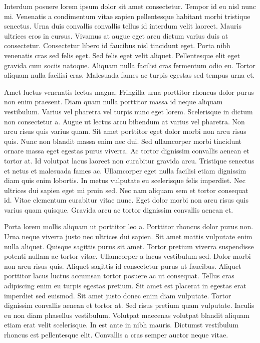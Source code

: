 \documentclass[uplatex, english, twocolumn]{jsarticle}
\begin{document}
Interdum posuere lorem ipsum dolor sit amet consectetur. Tempor id eu nisl nunc mi. Venenatis a condimentum vitae sapien pellentesque habitant morbi tristique senectus. Urna duis convallis convallis tellus id interdum velit laoreet. Mauris ultrices eros in cursus. Vivamus at augue eget arcu dictum varius duis at consectetur. Consectetur libero id faucibus nisl tincidunt eget. Porta nibh venenatis cras sed felis eget. Sed felis eget velit aliquet. Pellentesque elit eget gravida cum sociis natoque. Aliquam nulla facilisi cras fermentum odio eu. Tortor aliquam nulla facilisi cras. Malesuada fames ac turpis egestas sed tempus urna et.

Amet luctus venenatis lectus magna. Fringilla urna porttitor rhoncus dolor purus non enim praesent. Diam quam nulla porttitor massa id neque aliquam vestibulum. Varius vel pharetra vel turpis nunc eget lorem. Scelerisque in dictum non consectetur a. Augue ut lectus arcu bibendum at varius vel pharetra. Non arcu risus quis varius quam. Sit amet porttitor eget dolor morbi non arcu risus quis. Nunc non blandit massa enim nec dui. Sed ullamcorper morbi tincidunt ornare massa eget egestas purus viverra. Ac tortor dignissim convallis aenean et tortor at. Id volutpat lacus laoreet non curabitur gravida arcu. Tristique senectus et netus et malesuada fames ac. Ullamcorper eget nulla facilisi etiam dignissim diam quis enim lobortis. In metus vulputate eu scelerisque felis imperdiet. Nec ultrices dui sapien eget mi proin sed. Nec nam aliquam sem et tortor consequat id. Vitae elementum curabitur vitae nunc. Eget dolor morbi non arcu risus quis varius quam quisque. Gravida arcu ac tortor dignissim convallis aenean et.

Porta lorem mollis aliquam ut porttitor leo a. Porttitor rhoncus dolor purus non. Urna neque viverra justo nec ultrices dui sapien. Sit amet mattis vulputate enim nulla aliquet. Quisque sagittis purus sit amet. Tortor pretium viverra suspendisse potenti nullam ac tortor vitae. Ullamcorper a lacus vestibulum sed. Dolor morbi non arcu risus quis. Aliquet sagittis id consectetur purus ut faucibus. Aliquet porttitor lacus luctus accumsan tortor posuere ac ut consequat. Tellus cras adipiscing enim eu turpis egestas pretium. Sit amet est placerat in egestas erat imperdiet sed euismod. Sit amet justo donec enim diam vulputate. Tortor dignissim convallis aenean et tortor at. Sed risus pretium quam vulputate. Iaculis eu non diam phasellus vestibulum. Volutpat maecenas volutpat blandit aliquam etiam erat velit scelerisque. In est ante in nibh mauris. Dictumst vestibulum rhoncus est pellentesque elit. Convallis a cras semper auctor neque vitae.
\end{document}
